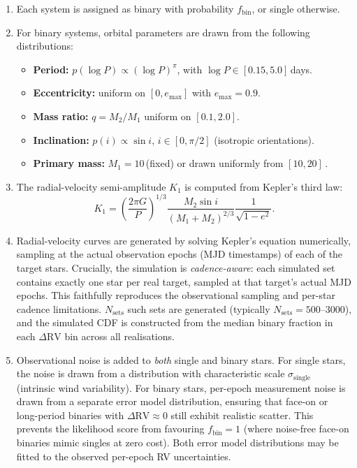 \begin{enumerate}
\item Each system is assigned as binary with probability $f_\mathrm{bin}$,
  or single otherwise.

\item For binary systems, orbital parameters are drawn from the following
  distributions:
  \begin{itemize}
  \item \textbf{Period:} $p(\log P) \propto (\log P)^{\pi}$, with
    $\log P \in [0.15, 5.0]$\,days.
  \item \textbf{Eccentricity:} uniform on $[0, e_\mathrm{max}]$ with
    $e_\mathrm{max} = 0.9$.
  \item \textbf{Mass ratio:} $q = M_2/M_1$ uniform on $[0.1, 2.0]$.
  \item \textbf{Inclination:} $p(i) \propto \sin i$, $i \in [0, \pi/2]$
    (isotropic orientations).
  \item \textbf{Primary mass:} $M_1 = 10$\,\Msun (fixed) or drawn
    uniformly from $[10, 20]$\,\Msun.
  \end{itemize}

\item The radial-velocity semi-amplitude $K_1$ is computed from Kepler's
  third law:
  \begin{equation}
  K_1 = \left(\frac{2\pi G}{P}\right)^{1/3}
        \frac{M_2 \sin i}{(M_1 + M_2)^{2/3}}
        \frac{1}{\sqrt{1 - e^2}}.
  \label{eq:K1}
  \end{equation}

\item Radial-velocity curves are generated by solving Kepler's equation
  numerically, sampling at the actual observation epochs (MJD timestamps)
  of each of the \Nstars target stars. Crucially, the simulation is
  \emph{cadence-aware}: each simulated set contains exactly one star per
  real target, sampled at that target's actual MJD epochs. This faithfully
  reproduces the observational sampling and per-star cadence limitations.
  $N_\mathrm{sets}$ such sets are generated (typically $N_\mathrm{sets} =
  500$--3000), and the simulated CDF is constructed from the median binary
  fraction in each $\Delta\mathrm{RV}$ bin across all realisations.

\item Observational noise is added to \emph{both} single and binary
  stars. For single stars, the noise is drawn from a distribution with
  characteristic scale $\sigma_\mathrm{single}$ (intrinsic wind
  variability). For binary stars, per-epoch measurement noise is drawn
  from a separate error model distribution, ensuring that face-on or
  long-period binaries with $\Delta\mathrm{RV} \approx 0$ still exhibit
  realistic scatter. This prevents the likelihood score from favouring
  $f_\mathrm{bin} = 1$ (where noise-free face-on binaries mimic singles
  at zero cost). Both error model distributions may be fitted to the
  observed per-epoch RV uncertainties.
\end{enumerate}

